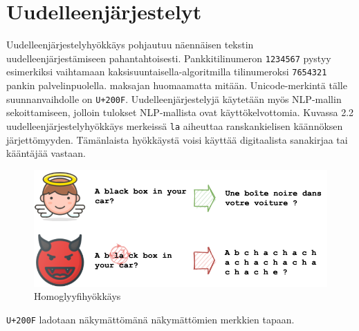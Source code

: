 \section{Uudelleenjärjestelyt}
Uudelleenjärjestelyhyökkäys pohjautuu näennäisen tekstin uudelleenjärjestämiseen pahantahtoisesti. Pankkitilinumeron \texttt{1234567} pystyy esimerkiksi vaihtamaan kaksisuuntaisella-algoritmilla tilinumeroksi \texttt{7654321} pankin palvelinpuolella. maksajan huomaamatta mitään. Unicode-merkintä tälle suunnanvaihdolle on \texttt{U+200F}. Uudelleenjärjestelyjä käytetään myös NLP-mallin sekoittamiseen, jolloin tulokset NLP-mallista ovat käyttökelvottomia. Kuvassa 2.2 uudelleenjärjestelyhyökkäys merkeissä \texttt{la} aiheuttaa ranskankielisen käännöksen järjettömyyden. Tämänlaista hyökkäystä voisi käyttää digitaalista sanakirjaa tai kääntäjää vastaan. \citep{boucher2021bad}
\begin{figure}[t]
  \includegraphics[scale=0.5]{figures/reordering.png}
  \caption{Homoglyyfihyökkäys \citep{boucher2021bad}}
\end{figure}
\texttt{U+200F} ladotaan näkymättömänä näkymättömien merkkien tapaan.
